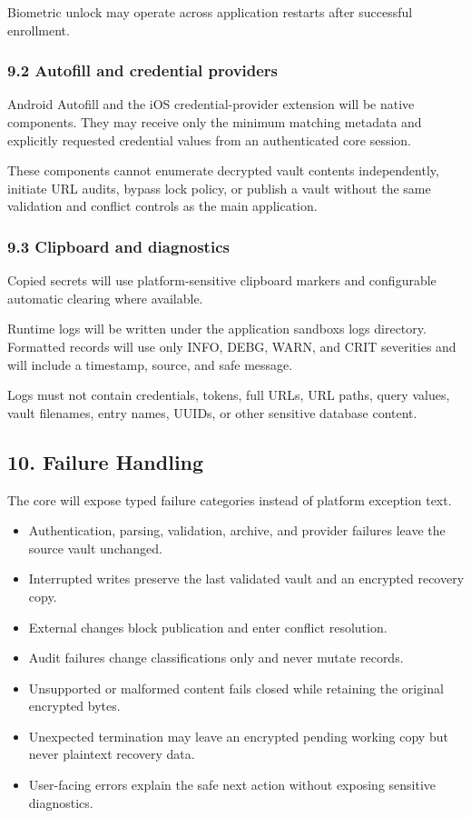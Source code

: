 \documentclass[
  letterpaper,
]{article}
\providecommand{\tightlist}{%
  \setlength{\itemsep}{0pt}\setlength{\parskip}{0pt}}
\begin{document}
Biometric unlock may operate across application restarts after successful enrollment.

\subsubsection{9.2 Autofill and credential providers}\label{92-autofill-and-credential-providers}

Android Autofill and the iOS credential-provider extension will be native components. They may receive only the minimum
matching metadata and explicitly requested credential values from an authenticated core session.

These components cannot enumerate decrypted vault contents independently, initiate URL audits, bypass lock policy, or
publish a vault without the same validation and conflict controls as the main application.

\subsubsection{9.3 Clipboard and diagnostics}\label{93-clipboard-and-diagnostics}

Copied secrets will use platform-sensitive clipboard markers and configurable automatic clearing where available.

Runtime logs will be written under the application sandbox\textquotesingle s logs directory. Formatted records will use
only INFO, DEBG, WARN, and CRIT severities and will include a timestamp, source, and safe message.

Logs must not contain credentials, tokens, full URLs, URL paths, query values, vault filenames, entry names, UUIDs, or
other sensitive database content.

\subsection{10. Failure Handling}\label{10-failure-handling}

The core will expose typed failure categories instead of platform exception text.

\begin{itemize}
\tightlist
\item
  Authentication, parsing, validation, archive, and provider failures leave the source vault unchanged.
\item
  Interrupted writes preserve the last validated vault and an encrypted recovery copy.
\item
  External changes block publication and enter conflict resolution.
\item
  Audit failures change classifications only and never mutate records.
\item
  Unsupported or malformed content fails closed while retaining the original encrypted bytes.
\item
  Unexpected termination may leave an encrypted pending working copy but never plaintext recovery data.
\item
  User-facing errors explain the safe next action without exposing sensitive diagnostics.
\end{itemize}
\end{document}

